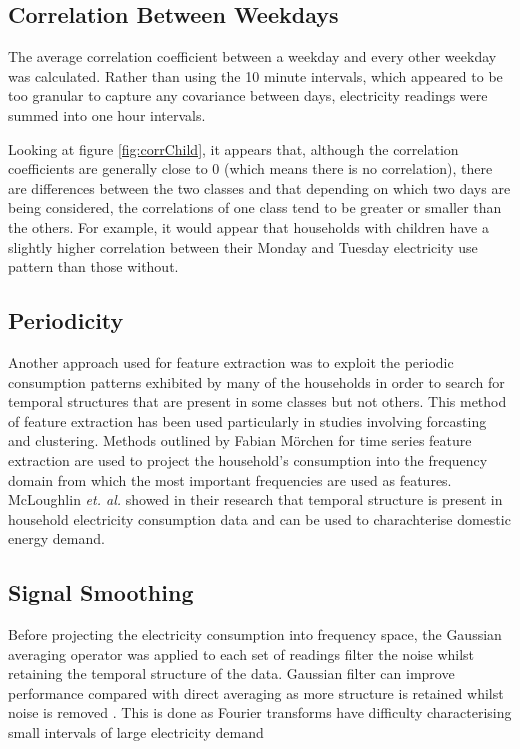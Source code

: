 \logADVChild
\logADVSocio

\subsection*{Correlation Between Weekdays}

The average correlation coefficient between a weekday and every other weekday was calculated. Rather than using the 10 minute intervals, which appeared to be too granular to capture any covariance between days, electricity readings were summed into one hour intervals.


\corrChild

Looking at figure \ref{fig:corrChild}, it appears that, although the correlation coefficients are generally close to 0 (which means there is no correlation), there are differences between the two classes and that depending on which two days are being considered, the correlations of one class tend to be greater or smaller than the others. For example, it would appear that households with children have a slightly higher correlation between their Monday and Tuesday electricity use pattern than those without.

\corrSocio 


\subsection{Periodicity}

Another approach used for feature extraction was to exploit the periodic consumption patterns exhibited by many of the households in order to search for temporal structures that are present in some classes but not others. This method of feature extraction has been used particularly in studies involving forcasting and clustering. Methods outlined by Fabian Mörchen \cite{Moerchen} for time series feature extraction are used to project the household's consumption into the frequency domain from which the most important frequencies are used as features. McLoughlin \textit{et. al.} \cite{McLoughlin} showed in their research that temporal structure is present in household electricity consumption data and can be used to charachterise domestic energy demand.


\subsection{Signal Smoothing}

Before projecting the electricity consumption into frequency space, the Gaussian averaging operator was applied to each set of readings filter the noise whilst retaining the temporal structure of the data. Gaussian filter can improve performance compared with direct averaging as more structure is retained whilst noise is removed \cite{Nixon}. This is done as Fourier transforms have difficulty characterising small intervals of large electricity demand \cite{Graps}


